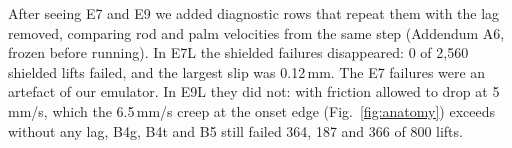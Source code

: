  After seeing E7 and E9 we added diagnostic rows that repeat
them with the lag removed, comparing rod and palm velocities from the same step (Addendum A6, frozen before running).
In E7L the shielded failures disappeared: 0 of 2{,}560 shielded lifts failed, and the largest slip was 0.12\,mm. The E7
failures were an artefact of our emulator. In E9L they did not: with friction allowed to drop at 5\,mm/s, which the
6.5\,mm/s creep at the onset edge (Fig.~\ref{fig:anatomy}) exceeds without any lag, B4g, B4t and B5 still failed 364, 187 and 366 of 800 lifts.


